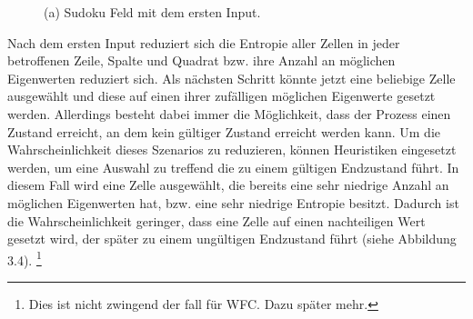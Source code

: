 \documentclass[12pt, a4paper,twoside,openany]{report} %
\begin{document}
\begin{figure}[H]
    \centering
    \caption{(a) Sudoku Feld mit dem ersten Input.}%
\end{figure}

Nach dem ersten Input reduziert sich die Entropie aller Zellen in jeder betroffenen Zeile,
Spalte und Quadrat bzw. ihre Anzahl an möglichen Eigenwerten reduziert sich.
Als nächsten Schritt könnte jetzt eine beliebige Zelle ausgewählt und diese auf einen ihrer zufälligen möglichen Eigenwerte gesetzt werden.
Allerdings besteht dabei immer die Möglichkeit, dass der Prozess einen Zustand erreicht, an dem kein gültiger Zustand erreicht werden kann.
Um die Wahrscheinlichkeit dieses Szenarios zu reduzieren, können Heuristiken eingesetzt werden,
um eine Auswahl zu treffend die zu einem gültigen Endzustand führt.
In diesem Fall wird eine Zelle ausgewählt, die bereits eine sehr niedrige Anzahl an möglichen Eigenwerten hat, bzw. eine sehr niedrige Entropie besitzt.
Dadurch ist die Wahrscheinlichkeit geringer, dass eine Zelle auf einen nachteiligen Wert gesetzt wird, der später zu einem ungültigen Endzustand führt {(siehe Abbildung 3.4)}.
\footnote[2]{Dies ist nicht zwingend der fall für WFC. Dazu später mehr.}
\end{document}
